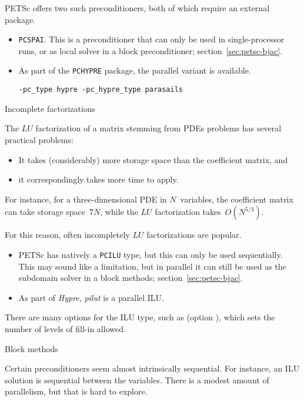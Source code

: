 PETSc offers two such preconditioners, both of which require an external package.
\begin{itemize}
\item \lstinline{PCSPAI}. This is a preconditioner that can only be
  used in single-processor runs, or as local solver in a block
  preconditioner; section~\ref{sec:petsc-bjac}.
\item As part of the \lstinline{PCHYPRE} package, the parallel variant
   is available.
\begin{verbatim}
-pc_type hypre -pc_hypre_type parasails
\end{verbatim}
\end{itemize}

 {Incomplete factorizations}

The $LU$ factorization of a matrix stemming from \acp{PDE} problems
has several practical problems:
\begin{itemize}
\item It takes (considerably) more storage space than the coefficient matrix, and
\item it correspondingly takes more time to apply.
\end{itemize}
For instance, for a three-dimensional \ac{PDE} in $N$~variables, the coefficient matrix
can take storage space~$7N$, while the $LU$ factorization takes~$O(N^{5/3})$.

For this reason, often incompletely $LU$ factorizations are popular.
\begin{itemize}
\item PETSc has natively a \lstinline{PCILU} type, but this can only be used sequentially.
  This may sound like a limitation, but in parallel it can still be used as the
  subdomain solver in a block methods; section~\ref{sec:petsc-bjac}.
\item As part of \emph{Hypre}, \emph{pilut} is a parallel ILU.
\end{itemize}

There are many options for the ILU type, such as
(option ),
which sets the number of levels of fill-in allowed.

 {Block methods}
\label{sec:petsc-bjac}

Certain preconditioners seem almost intrinsically sequential.
For instance, an ILU solution is sequential between the variables.
There is a modest amount of parallelism, but that is hard to explore.

